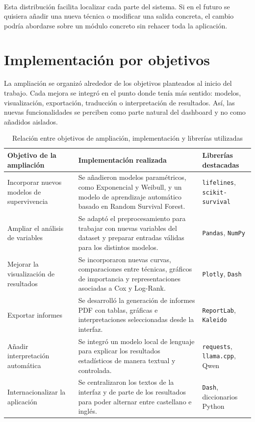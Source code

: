 \paragraph*{}
Esta distribución facilita localizar cada parte del sistema. Si en el futuro se quisiera añadir una nueva técnica o modificar una salida concreta, el cambio podría abordarse sobre un módulo concreto sin rehacer toda la aplicación.

\section{Implementación por objetivos}

\paragraph*{}
La ampliación se organizó alrededor de los objetivos planteados al inicio del trabajo. Cada mejora se integró en el punto donde tenía más sentido: modelos, visualización, exportación, traducción o interpretación de resultados. Así, las nuevas funcionalidades se perciben como parte natural del dashboard y no como añadidos aislados.

\begin{table}[H]
\centering
\small
\begin{tabularx}{\textwidth}{|p{}|X|p{}|}
\hline
\textbf{Objetivo de la ampliación} & \textbf{Implementación realizada} & \textbf{Librerías destacadas} \\ \hline
Incorporar nuevos modelos de supervivencia & Se añadieron modelos paramétricos, como Exponencial y Weibull, y un modelo de aprendizaje automático basado en Random Survival Forest. & \texttt{lifelines}, \texttt{scikit-survival} \\ \hline
Ampliar el análisis de variables & Se adaptó el preprocesamiento para trabajar con nuevas variables del dataset y preparar entradas válidas para los distintos modelos. & \texttt{Pandas}, \texttt{NumPy} \\ \hline
Mejorar la visualización de resultados & Se incorporaron nuevas curvas, comparaciones entre técnicas, gráficos de importancia y representaciones asociadas a Cox y Log-Rank. & \texttt{Plotly}, \texttt{Dash} \\ \hline
Exportar informes & Se desarrolló la generación de informes PDF con tablas, gráficas e interpretaciones seleccionadas desde la interfaz. & \texttt{ReportLab}, \texttt{Kaleido} \\ \hline
Añadir interpretación automática & Se integró un modelo local de lenguaje para explicar los resultados estadísticos de manera textual y controlada. & \texttt{requests}, \texttt{llama.cpp}, Qwen \\ \hline
Internacionalizar la aplicación & Se centralizaron los textos de la interfaz y de parte de los resultados para poder alternar entre castellano e inglés. & \texttt{Dash}, diccionarios Python \\ \hline
\end{tabularx}
\caption{Relación entre objetivos de ampliación, implementación y librerías utilizadas}
\label{tab:implementacion_objetivos}
\normalsize
\end{table}

